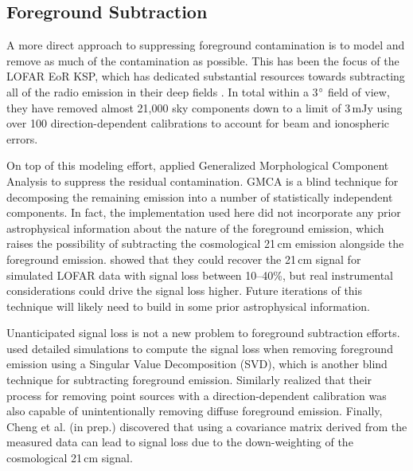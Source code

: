 \begin{bibunit}

\subsection{Foreground Subtraction}

A more direct approach to suppressing foreground contamination is to model and remove as much of the
contamination as possible. This has been the focus of the LOFAR EoR KSP, which has dedicated
substantial resources towards subtracting all of the radio emission in their deep fields
\citep{2017ApJ...838...65P}. In total within a 3$\mbox{$^\circ$}$ field of view, they have removed almost
21,000 sky components down to a limit of 3\,mJy using over 100 direction-dependent calibrations to
account for beam and ionospheric errors.

On top of this modeling effort, \citet{2017ApJ...838...65P} applied Generalized Morphological
Component Analysis \citep[GMCA;][]{2013MNRAS.429..165C} to suppress the residual contamination.
GMCA is a blind technique for decomposing the remaining emission into a number of statistically
independent components. In fact, the implementation used here did not incorporate any prior
astrophysical information about the nature of the foreground emission, which raises the possibility
of subtracting the cosmological 21\,cm emission alongside the foreground emission.
\citet{2013MNRAS.429..165C} showed that they could recover the 21\,cm signal for simulated LOFAR
data with signal loss between 10--40\%, but real instrumental considerations could drive the signal
loss higher. Future iterations of this technique will likely need to build in some prior
astrophysical information.

Unanticipated signal loss is not a new problem to foreground subtraction efforts.
\citet{2013MNRAS.433..639P} used detailed simulations to compute the signal loss when removing
foreground emission using a Singular Value Decomposition (SVD), which is another blind technique for
subtracting foreground emission. Similarly \citet{2016MNRAS.463.4317P} realized that their process
for removing point sources with a direction-dependent calibration was also capable of
unintentionally removing diffuse foreground emission. Finally, Cheng et al. (in prep.) discovered
that using a covariance matrix derived from the measured data can lead to signal loss due to the
down-weighting of the cosmological 21\,cm signal.



\end{bibunit}
